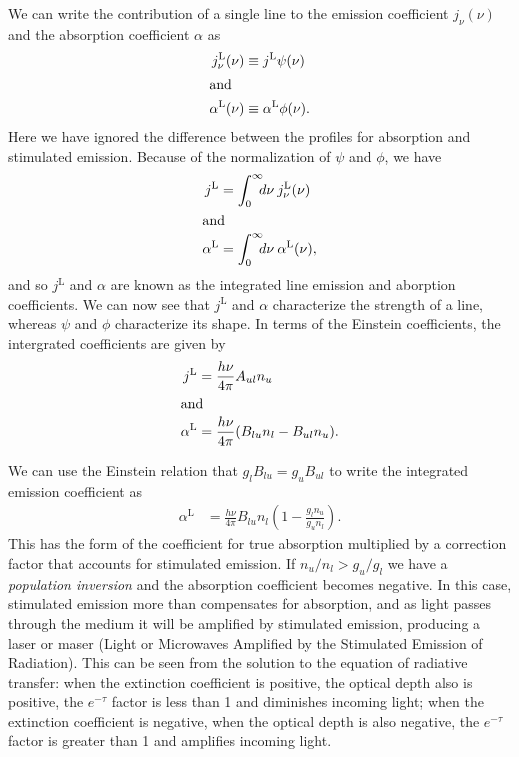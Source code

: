 We can write the contribution of a single line to the
emission coefficient $j_\nu(\nu)$ and the absorption
coefficient $\alpha$ as
\begin{align}
j_\nu^\mathrm{L}(\nu) &\equiv j^\mathrm{L} \psi(\nu)\\
\intertext{and}
\alpha^\mathrm{L}(\nu) &\equiv \alpha^\mathrm{L} \phi(\nu).
\end{align}
Here we have ignored the difference between the profiles for
absorption and stimulated emission. Because of the
normalization of $\psi$ and $\phi$, we have
\begin{align}
j^\mathrm{L} &= \int_0^\infty\!\!\!d\nu\:j_\nu^\mathrm{L}(\nu)\\
\intertext{and}
\alpha^\mathrm{L} &= \int_0^\infty\!\!\!d\nu\:\alpha^\mathrm{L}(\nu),
\end{align}
and so $j^\mathrm{L}$ and $\alpha$ are known as the
integrated line emission and aborption coefficients. We can
now see that $j^\mathrm{L}$ and $\alpha$ characterize
the strength of a line, whereas $\psi$ and $\phi$
characterize its shape. In terms of the Einstein
coefficients, the intergrated coefficients are given by
\begin{align}
j^\mathrm{L} &= \frac{h\nu}{4\pi} A_{ul} n_u\\
\intertext{and}
\alpha^\mathrm{L} &= \frac{h\nu}{4\pi} (B_{lu} n_l - B_{ul}
n_u).
\end{align}

We can use the Einstein relation that $g_l B_{lu} = g_u
B_{ul}$ to write the integrated emission coefficient as
\begin{align}
\alpha^\mathrm{L} &= \frac{h\nu}{4\pi} B_{lu} n_l \left(1 - 
\frac{g_l n_u}{g_u n_l}\right).
\end{align}
This has the form of the coefficient for true absorption
multiplied by a correction factor that accounts for
stimulated emission. If $n_u/n_l > g_u/g_l$ we have a
\emph{population inversion} and the absorption coefficient
becomes negative. In this case, stimulated emission more
than compensates for absorption, and as light passes through
the medium it will be amplified by stimulated emission,
producing a laser or maser (Light or Microwaves Amplified by
the Stimulated Emission of Radiation). This can be seen from
the solution to the equation of radiative transfer: when the
extinction coefficient is positive, the optical depth also
is positive, the $e^{-\tau}$ factor is less than 1 and
diminishes incoming light; when the extinction coefficient
is negative, when the optical depth is also negative, the
$e^{-\tau}$ factor is greater than 1 and amplifies incoming
light.

